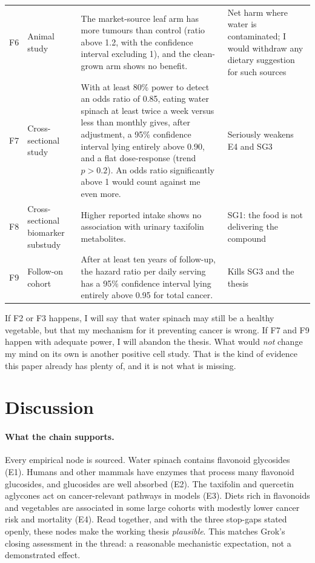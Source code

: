 \documentclass[11pt,a4paper]{article}
\begin{document}
{\begin{longtable}{@{}>{\raggedright\arraybackslash}p{0.7cm} >{\raggedright\arraybackslash}p{2.6cm} >{\raggedright\arraybackslash}p{8.3cm} >{\raggedright\arraybackslash}p{3.0cm}@{}}
F6 & Animal study & The market-source leaf arm has more tumours than control (ratio above 1.2, with the confidence interval excluding 1), and the clean-grown arm shows no benefit. & Net harm where water is contaminated; I would withdraw any dietary suggestion for such sources\\
F7 & Cross-sectional study & With at least 80\% power to detect an odds ratio of 0.85, eating water spinach at least twice a week versus less than monthly gives, after adjustment, a 95\% confidence interval lying entirely above 0.90, and a flat dose-response (trend $p>0.2$). An odds ratio significantly above 1 would count against me even more. & Seriously weakens E4 and SG3\\
F8 & Cross-sectional biomarker substudy & Higher reported intake shows no association with urinary taxifolin metabolites. & SG1: the food is not delivering the compound\\
F9 & Follow-on cohort & After at least ten years of follow-up, the hazard ratio per daily serving has a 95\% confidence interval lying entirely above 0.95 for total cancer. & Kills SG3 and the thesis\\
\end{longtable}
}

\noindent If F2 or F3 happens, I will say that water spinach may still be a healthy vegetable, but that my mechanism for it preventing cancer is wrong. If F7 and F9 happen with adequate power, I will abandon the thesis. What would \emph{not} change my mind on its own is another positive cell study. That is the kind of evidence this paper already has plenty of, and it is not what is missing.

\section{Discussion}
\label{sec:discussion}

\paragraph{What the chain supports.} Every empirical node is sourced. Water spinach contains flavonoid glycosides (E1). Humans and other mammals have enzymes that process many flavonoid glucosides, and glucosides are well absorbed (E2). The taxifolin and quercetin aglycones act on cancer-relevant pathways in models (E3). Diets rich in flavonoids and vegetables are associated in some large cohorts with modestly lower cancer risk and mortality (E4). Read together, and with the three stop-gaps stated openly, these nodes make the working thesis \emph{plausible}. This matches Grok's closing assessment in the thread: a reasonable mechanistic expectation, not a demonstrated effect.
\end{document}
